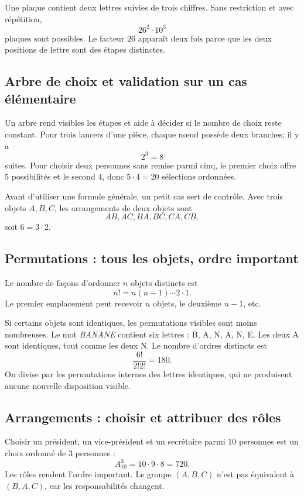 \documentclass[12pt,a4paper,openany]{book}
\begin{document}
\begin{examplebox}
Une plaque contient deux lettres suivies de trois chiffres. Sans restriction et avec répétition,
\[
26^2\cdot10^3
\]
plaques sont possibles. Le facteur $26$ apparaît deux fois parce que les deux positions de lettre sont des étapes distinctes.
\end{examplebox}

\subsection{Arbre de choix et validation sur un cas élémentaire}

Un arbre rend visibles les étapes et aide à décider si le nombre de choix reste constant. Pour trois lancers d'une pièce, chaque nœud possède deux branches; il y a
\[
2^3=8
\]
suites. Pour choisir deux personnes sans remise parmi cinq, le premier choix offre $5$ possibilités et le second $4$, donc $5\cdot4=20$ sélections ordonnées.

Avant d'utiliser une formule générale, un petit cas sert de contrôle. Avec trois objets $A,B,C$, les arrangements de deux objets sont
\[
AB,AC,BA,BC,CA,CB,
\]
soit $6=3\cdot2$.

\subsection{Permutations : tous les objets, ordre important}

Le nombre de façons d'ordonner $n$ objets distincts est
\[
n!=n(n-1)\cdots2\cdot1.
\]
Le premier emplacement peut recevoir $n$ objets, le deuxième $n-1$, etc.

Si certains objets sont identiques, les permutations visibles sont moins nombreuses. Le mot \emph{BANANE} contient six lettres : B, A, N, A, N, E. Les deux A sont identiques, tout comme les deux N. Le nombre d'ordres distincts est
\[
\frac{6!}{2!2!}=180.
\]
On divise par les permutations internes des lettres identiques, qui ne produisent aucune nouvelle disposition visible.

\subsection{Arrangements : choisir et attribuer des rôles}

Choisir un président, un vice-président et un secrétaire parmi $10$ personnes est un choix ordonné de $3$ personnes :
\[
A_{10}^3=10\cdot9\cdot8=720.
\]
Les rôles rendent l'ordre important. Le groupe $(A,B,C)$ n'est pas équivalent à $(B,A,C)$, car les responsabilités changent.
\end{document}
